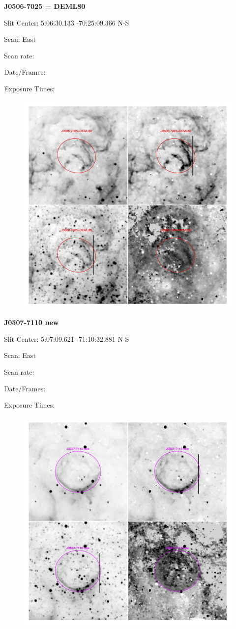 \documentclass[11pt]{article}
\begin{document}
\newpage
{\bf J0506-7025 = DEML80}  
 
Slit Center:   5:06:30.133    -70:25:09.366     N-S

Scan:  East

Scan rate:  

Date/Frames:

Exposure Times:  

\begin{figure}
\includegraphics[width=11.cm]{snapshots/J0506-7025.png}
\end{figure}

\newpage
{\bf J0507-7110 new}  
 
Slit Center:   5:07:09.621   -71:10:32.881     N-S

Scan:  East

Scan rate:  

Date/Frames:

Exposure Times:  

\begin{figure}
\includegraphics[width=11.cm]{snapshots/J0507-7110.png}
\end{figure}
\end{document}
